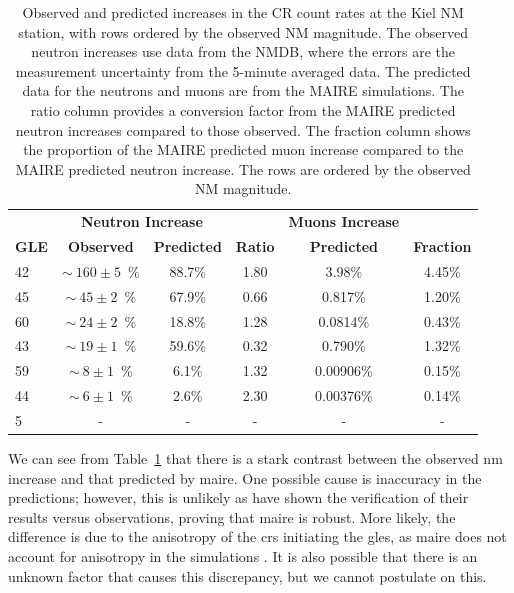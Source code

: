 \begin{table}[ht!]
	\begin{center}
		\caption{Observed and predicted increases in the CR count rates at the Kiel NM station, with rows ordered by the observed NM magnitude. The observed neutron increases use data from the NMDB, where the errors are the measurement uncertainty from the 5-minute averaged data. The predicted data for the neutrons and muons are from the MAIRE simulations. The ratio column provides a conversion factor from the MAIRE predicted neutron increases compared to those observed. The fraction column shows the proportion of the MAIRE predicted muon increase compared to the MAIRE predicted neutron increase. The rows are ordered by the observed NM magnitude.}
		\label{tab:KIEL_GLEs}
		\begin{tabular}{l c c c | c c}
			\hline
			&  \multicolumn{2}{c}{\bf Neutron Increase} & & {\bf Muons Increase} & \\
			{\bf GLE} & {\bf Observed} & {\bf Predicted} & {\bf Ratio} & {\bf Predicted} & {\bf Fraction}\\ 
			\hline
			42 & $\sim~160\pm5$~\% & 88.7\% & 1.80 & 3.98\% & 4.45\% \\
			45  & $\sim~45\pm2$~\% & 67.9\% & 0.66 & 0.817\% & 1.20\% \\
			60 & $\sim~24\pm2$~\% & 18.8\% & 1.28 & 0.0814\% & 0.43\% \\
			43 & $\sim~19\pm1$~\% & 59.6\% & 0.32 & 0.790\% & 1.32\% \\
			59 & $\sim~8\pm1$~\% & 6.1\% & 1.32 & 0.00906\% & 0.15\% \\
			44  & $\sim~6\pm1$~\% & 2.6\% & 2.30 & 0.00376\% & 0.14\% \\
			5 & - & - & - & - & - \\
			\hline
		\end{tabular}
	\end{center}
\end{table}

We can see from Table~\ref{tab:KIEL_GLEs} that there is a stark contrast between the observed \gls{nm} increase and that predicted by \gls{maire}. One possible cause is inaccuracy in the predictions; however, this is unlikely as \citet{lei_atmospheric_2004} have shown the verification of their results versus observations, proving that \gls{maire} is robust. More likely, the difference is due to the anisotropy of the \glspl{cr} initiating the \glspl{gle}, as \gls{maire} does not account for anisotropy in the simulations \citep{dyer_calculations_2003, lei_atmospheric_2004}. It is also possible that there is an unknown factor that causes this discrepancy, but we cannot postulate on this. 

